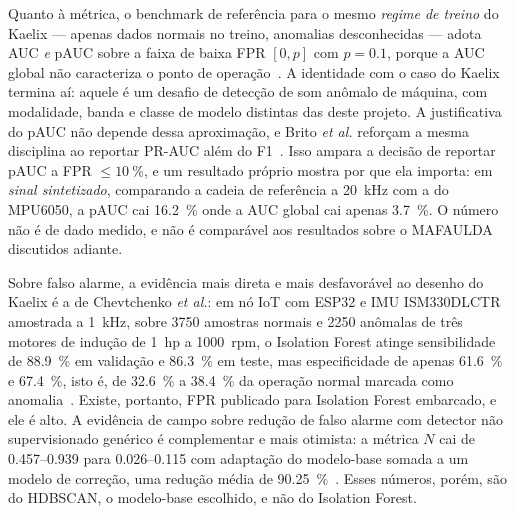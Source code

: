 \documentclass[11pt,a4paper]{article}
\begin{document}
Quanto à métrica, o benchmark de referência para o mesmo \emph{regime de treino} do Kaelix
--- apenas dados normais no treino, anomalias desconhecidas --- adota AUC \emph{e} pAUC
sobre a faixa de baixa FPR $[0, p]$ com $p = \num{0,1}$, porque a AUC global não
caracteriza o ponto de operação~\cite{koizumi2020}. A identidade com o caso do Kaelix
termina aí: aquele é um desafio de detecção de som anômalo de máquina, com modalidade,
banda e classe de modelo distintas das deste projeto. A justificativa do pAUC não depende
dessa aproximação, e Brito \emph{et al.} reforçam a mesma disciplina ao reportar PR-AUC
além do F1~\cite{brito2022}. Isso ampara a decisão de reportar pAUC a FPR $\leq
\SI{10}{\percent}$, e um resultado próprio mostra por que ela importa: em \emph{sinal
sintetizado}, comparando a cadeia de referência a \SI{20}{\kilo\hertz} com a do MPU6050,
a pAUC cai \SI{16,2}{\percent} onde a AUC global cai apenas \SI{3,7}{\percent}. O número
não é de dado medido, e não é comparável aos resultados sobre o MAFAULDA discutidos
adiante.

Sobre falso alarme, a evidência mais direta e mais desfavorável ao desenho do Kaelix é a
de Chevtchenko \emph{et al.}: em nó IoT com ESP32 e IMU ISM330DLCTR amostrada a
\SI{1}{\kilo\hertz}, sobre \num{3750} amostras normais e \num{2250} anômalas de três
motores de indução de 1~hp a \num{1000}~rpm, o Isolation Forest atinge sensibilidade de
\SI{88,9}{\percent} em validação e \SI{86,3}{\percent} em teste, mas especificidade de
apenas \SI{61,6}{\percent} e \SI{67,4}{\percent}, isto é, de \SI{32,6}{\percent} a
\SI{38,4}{\percent} da operação normal marcada como anomalia~\cite{chevtchenko2023}.
Existe, portanto, FPR publicado para Isolation Forest embarcado, e ele é alto. A
evidência de campo sobre redução de falso alarme com detector não supervisionado genérico
é complementar e mais otimista: a métrica $N$ cai de \numrange{0,457}{0,939} para
\numrange{0,026}{0,115} com adaptação do modelo-base somada a um modelo de correção, uma
redução média de \SI{90,25}{\percent}~\cite{hermansa2022}. Esses números, porém, são do
HDBSCAN, o modelo-base escolhido, e não do Isolation Forest.
\end{document}
